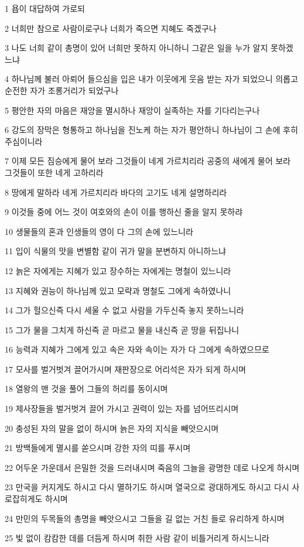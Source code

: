 \par 1 욥이 대답하여 가로되
\par 2 너희만 참으로 사람이로구나 너희가 죽으면 지혜도 죽겠구나
\par 3 나도 너희 같이 총명이 있어 너희만 못하지 아니하니 그같은 일을 누가 알지 못하겠느냐
\par 4 하나님께 불러 아뢰어 들으심을 입은 내가 이웃에게 웃음 받는 자가 되었으니 의롭고 순전한 자가 조롱거리가 되었구나
\par 5 평안한 자의 마음은 재앙을 멸시하나 재앙이 실족하는 자를 기다리는구나
\par 6 강도의 장막은 형통하고 하나님을 진노케 하는 자가 평안하니 하나님이 그 손에 후히 주심이니라
\par 7 이제 모든 짐승에게 물어 보라 그것들이 네게 가르치리라 공중의 새에게 물어 보라 그것들이 또한 네게 고하리라
\par 8 땅에게 말하라 네게 가르치리라 바다의 고기도 네게 설명하리라
\par 9 이것들 중에 어느 것이 여호와의 손이 이를 행하신 줄을 알지 못하랴
\par 10 생물들의 혼과 인생들의 영이 다 그의 손에 있느니라
\par 11 입이 식물의 맛을 변별함 같이 귀가 말을 분변하지 아니하느냐
\par 12 늙은 자에게는 지혜가 있고 장수하는 자에게는 명철이 있느니라
\par 13 지혜와 권능이 하나님께 있고 모략과 명철도 그에게 속하였나니
\par 14 그가 헐으신즉 다시 세울 수 없고 사람을 가두신즉 놓지 못하느니라
\par 15 그가 물을 그치게 하신즉 곧 마르고 물을 내신즉 곧 땅을 뒤집나니
\par 16 능력과 지혜가 그에게 있고 속은 자와 속이는 자가 다 그에게 속하였으므로
\par 17 모사를 벌거벗겨 끌어가시며 재판장으로 어리석은 자가 되게 하시며
\par 18 열왕의 맨 것을 풀어 그들의 허리를 동이시며
\par 19 제사장들을 벌거벗겨 끌어 가시고 권력이 있는 자를 넘어뜨리시며
\par 20 충성된 자의 말을 없이 하시며 늙은 자의 지식을 빼앗으시며
\par 21 방백들에게 멸시를 쏟으시며 강한 자의 띠를 푸시며
\par 22 어두운 가운데서 은밀한 것을 드러내시며 죽음의 그늘을 광명한 데로 나오게 하시며
\par 23 만국을 커지게도 하시고 다시 멸하기도 하시며 열국으로 광대하게도 하시고 다시 사로잡히게도 하시며
\par 24 만민의 두목들의 총명을 빼앗으시고 그들을 길 없는 거친 들로 유리하게 하시며
\par 25 빛 없이 캄캄한 데를 더듬게 하시며 취한 사람 같이 비틀거리게 하시느니라

